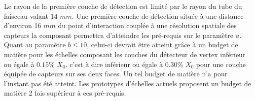   \medskip
  
  Le rayon de la premi\`ere couche de d\'etection est limit\'e par le rayon du tube du faisceau valant 14 $mm$. Une premi\`ere couche de d\'etection situ\'ee \`a une distance d'environ 16 $mm$ du point d'interaction coupl\'ee à une r\'esolution spatiale des capteurs la composant permettra d'atteindre les pr\'e-requis sur le param\`etre $a$. Quant au param\`etre $b\leq10$, celui-ci devrait être atteint gr\^ace \`a un budget de mati\`ere pour les échelles composant les couches du d\'etecteur de vertex inf\'erieur ou \'egale \`a $0.15 \%$ $X_0$, c'est \`a dire inf\'erieur ou \'egale \`a $0.30 \%$ $X_0$ pour une couche \'equipée de capteurs sur ses deux faces. Un tel budget de mati\`ere n'a pour l'instant pas \'et\'e atteint. Les prototypes d'échelles actuels proposent un budget de mati\`ere 2 fois sup\'erieur \`a ces pr\'e-requis.
  
% 
% 
  
 
